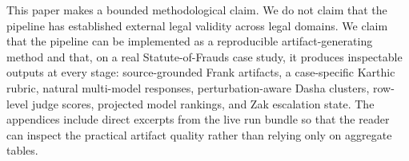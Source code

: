 This paper makes a bounded methodological claim. We do not claim that the
pipeline has established external legal validity across legal domains. We claim
that the pipeline can be implemented as a reproducible artifact-generating
method and that, on a real Statute-of-Frauds case study, it produces inspectable
outputs at every stage: source-grounded Frank artifacts, a case-specific Karthic
rubric, natural multi-model responses, perturbation-aware Dasha clusters,
row-level judge scores, projected model rankings, and Zak escalation state.
The appendices include direct excerpts from the live run bundle so that the
reader can inspect the practical artifact quality rather than relying only on
aggregate tables.

